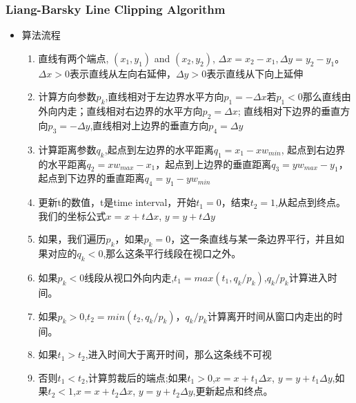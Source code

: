 \documentclass[UTF8]{ctexart}
\begin{document}
\subsubsection{Liang-Barsky Line Clipping Algorithm}
\begin{itemize}
    \item 算法流程
    \begin{enumerate}
        \item 直线有两个端点, $(x_1,y_1)$ and $(x_2,y_2)$, $\Delta x=x_2-x_1, \Delta y=y_2-y_1$。$\Delta x>0$表示直线从左向右延伸，$\Delta y>0$表示直线从下向上延伸
        \item 计算方向参数$p_k$,直线相对于左边界水平方向$p_1=-\Delta x$若$p_1<0$那么直线由外向内走；直线相对右边界的水平方向$p_2=\Delta x$; 直线相对下边界的垂直方向$p_3=-\Delta y$,直线相对上边界的垂直方向$p_4=\Delta y$
        \item 计算距离参数$q_k$,起点到左边界的水平距离$q_1=x_1-xw_{min}$, 起点到右边界的水平距离$q_2=xw_{max}-x_1$，起点到上边界的垂直距离$q_3=yw_{max}-y_1$，起点到下边界的垂直距离$q_4=y_1-yw_{min}$
        \item 更新t的数值，t是time interval，开始$t_1=0$，结束$t_2=1$,从起点到终点。我们的坐标公式$x=x+t\Delta x$, $y=y+t\Delta y$
        \item 如果，我们遍历$p_k$，如果$p_k=0$，这一条直线与某一条边界平行，并且如果对应的$q_k<0$,那么这条平行线段在视口之外。
        \item 如果$p_k<0$线段从视口外向内走,$t_1=max(t_1,q_k/p_k)$,$q_k/p_k$计算进入时间。
        \item 如果$p_k>0$,$t_2=min(t_2,q_k/p_k)$，$q_k/p_k$计算离开时间从窗口内走出的时间。
        \item 如果$t_1>t_2$,进入时间大于离开时间，那么这条线不可视
        \item 否则$t_1<t_2$,计算剪裁后的端点;如果$t_1>0$,$x=x+t_1\Delta x$, $y=y+t_1\Delta y$,如果$t_2<1$,$x=x+t_2\Delta x$, $y=y+t_2\Delta y$,更新起点和终点。

    \end{enumerate}
\end{itemize}
\end{document}
